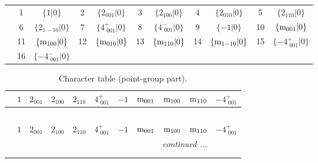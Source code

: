 \documentclass[fleqn,10pt,landscape]{article}
\begin{document}
\begin{itemize}
\begin{center}
\begin{longtable}{c|cc|cc|cc|cc|cc}
 & 1 & $\{1|0\}$ & 2 & $\{2{}_{001}|0\}$ & 3 & $\{2{}_{100}|0\}$ & 4 & $\{2{}_{010}|0\}$ & 5 & $\{2{}_{110}|0\}$ \\
& 6 & $\{2{}_{1-10}|0\}$ & 7 & $\{4^{+}_{\,\,001}|0\}$ & 8 & $\{4^{-}_{\,\,001}|0\}$ & 9 & $\{-1|0\}$ & 10 & $\{{\rm m}_{001}|0\}$ \\
& 11 & $\{{\rm m}_{100}|0\}$ & 12 & $\{{\rm m}_{010}|0\}$ & 13 & $\{{\rm m}_{110}|0\}$ & 14 & $\{{\rm m}_{1-10}|0\}$ & 15 & $\{-4^{+}_{\,\,001}|0\}$ \\
& 16 & $\{-4^{-}_{\,\,001}|0\}$ &  &  &  &  &  &  &  &  \\
\end{longtable}
\end{center}
\begin{center}
\renewcommand{\arraystretch}{1.0}
\begin{longtable}{c|rrrrrrrrrr}
\caption{Character table (point-group part).}
 \\
 \hline \hline
 & $ 1 $ & $ 2{}_{001} $ & $ 2{}_{100} $ & $ 2{}_{110} $ & $ 4^{+}_{\,\,001} $ & $ -1 $ & $ {\rm m}_{001} $ & $ {\rm m}_{100} $ & $ {\rm m}_{110} $ & $ -4^{+}_{\,\,001} $ \\ \hline \endfirsthead

\multicolumn{10}{l}{\tablename\ \thetable{}} \\
 \hline \hline
 & $ 1 $ & $ 2{}_{001} $ & $ 2{}_{100} $ & $ 2{}_{110} $ & $ 4^{+}_{\,\,001} $ & $ -1 $ & $ {\rm m}_{001} $ & $ {\rm m}_{100} $ & $ {\rm m}_{110} $ & $ -4^{+}_{\,\,001} $ \\ \hline \endhead

 \hline \hline
\multicolumn{10}{r}{\footnotesize\it continued ...} \\ \endfoot

 \hline \hline
\multicolumn{10}{r}{} \\ \endlastfoot


\end{longtable}
\end{center}
\end{itemize}
\end{document}
